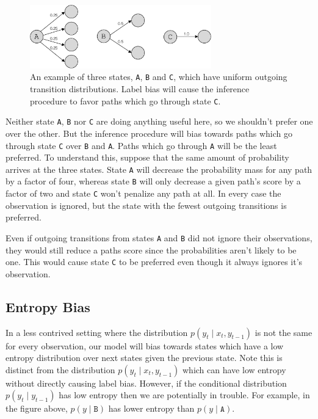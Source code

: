 \documentclass[11pt, letterpaper]{article}
\begin{document}
\begin{figure}
    \centering
    \includegraphics[width=0.7\textwidth]{figures/number_transitions.pdf}
    \caption{An example of three states, \texttt{A}, \texttt{B} and \texttt{C},
    which have uniform outgoing transition distributions. Label bias will cause
    the inference procedure to favor paths which go through state \texttt{C}.}
    \label{fig:trans}
\end{figure}

Neither state \texttt{A}, \texttt{B} nor \texttt{C} are doing anything useful
here, so we shouldn't prefer one over the other. But the inference procedure
will bias towards paths which go through state \texttt{C} over \texttt{B} and
\texttt{A}. Paths which go through \texttt{A} will be the least preferred. To
understand this, suppose that the same amount of probability arrives at the
three states. State \texttt{A} will decrease the probability mass for any path
by a factor of four, whereas state \texttt{B} will only decrease a given path's
score by a factor of two and state \texttt{C} won't penalize any path at all.
In every case the observation is ignored, but the state with the fewest
outgoing transitions is preferred.

Even if outgoing transitions from states \texttt{A} and \texttt{B} did not
ignore their observations, they would still reduce a paths score since the
probabilities aren't likely to be one. This would cause state \texttt{C} to be
preferred even though it always ignores it's observation.

\subsection{Entropy Bias}

In a less contrived setting where the distribution $p(y_t \mid x_t, y_{t-1})$
is not the same for every observation, our model will bias towards states which
have a low entropy distribution over next states given the previous state.
Note this is distinct from the distribution $p(y_t \mid x_t, y_{t-1})$ which
can have low entropy without directly causing label bias. However, if the
conditional distribution $p(y_t \mid y_{t-1})$ has low entropy then we are
potentially in trouble. For example, in the figure above, $p(y \mid
\texttt{B})$ has lower entropy than $p(y \mid \texttt{A})$.
\end{document}
